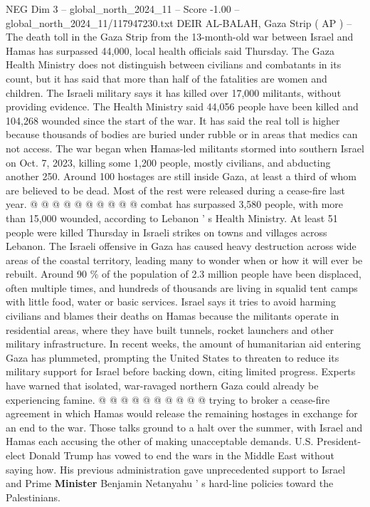 \begin{textsample}{NEG Dim 3 – global\_north\_2024\_11 – Score -1.00 – global\_north\_2024\_11/117947230.txt}  \label{ex:f3_neg_279}
DEIR AL-BALAH, Gaza Strip ( AP ) -- The death toll in the Gaza Strip from the 13-month-old war between Israel and Hamas has surpassed 44,000, local health officials said Thursday.
The Gaza Health Ministry does not distinguish between civilians and combatants in its count, but it has said that more than half of the fatalities are women and children.
The Israeli military says it has killed over 17,000 militants, without providing evidence.
The Health Ministry said 44,056 people have been killed and 104,268 wounded since the start of the war.
It has said the real toll is higher because thousands of bodies are buried under rubble or in areas that medics can not access.
The war began when Hamas-led militants stormed into southern Israel on Oct. 7, 2023, killing some 1,200 people, mostly civilians, and abducting another 250.
Around 100 hostages are still inside Gaza, at least a third of whom are believed to be dead.
Most of the rest were released during a cease-fire last year. @ @ @ @ @ @ @ @ @ @ combat has surpassed 3,580 people, with more than 15,000 wounded, according to Lebanon ' s Health Ministry.
At least 51 people were killed Thursday in Israeli strikes on towns and villages across Lebanon.
The Israeli offensive in Gaza has caused heavy destruction across wide areas of the coastal territory, leading many to wonder when or how it will ever be rebuilt.
Around 90 \% of the population of 2.3 million people have been displaced, often multiple times, and hundreds of thousands are living in squalid tent camps with little food, water or basic services.
Israel says it tries to avoid harming civilians and blames their deaths on Hamas because the militants operate in residential areas, where they have built tunnels, rocket launchers and other military infrastructure.
In recent weeks, the amount of humanitarian aid entering Gaza has plummeted, prompting the United States to threaten to reduce its military support for Israel before backing down, citing limited progress.
Experts have warned that isolated, war-ravaged northern Gaza could already be experiencing famine. @ @ @ @ @ @ @ @ @ @ trying to broker a cease-fire agreement in which Hamas would release the remaining hostages in exchange for an end to the war.
Those talks ground to a halt over the summer, with Israel and Hamas each accusing the other of making unacceptable demands.
U.S.
President-elect Donald Trump has vowed to end the wars in the Middle East without saying how.
His previous administration gave unprecedented support to Israel and Prime \textbf{Minister} Benjamin Netanyahu ' s hard-line policies toward the Palestinians.

\end{textsample}
